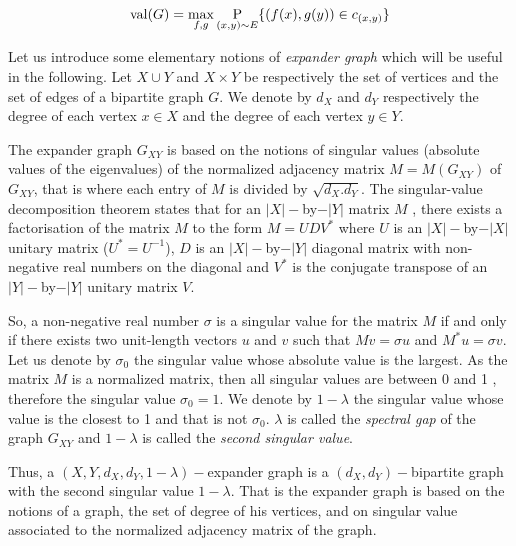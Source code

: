  $$\mathrm{val} (G)=\max_{f,g}\underset{(x,y)\sim E}{ \mathrm{P}} \{(f(x),g(y)) \in c_{(x,y)} \}$$

 Let us introduce some elementary notions of \textit{expander graph} which will be useful in the following.  Let $X \cup Y$ and $X\times Y$ be respectively the set of vertices and the set of edges of a bipartite graph $G$. We denote by $d_X$ and $d_Y$ respectively the degree of each vertex $x\in X$ and the degree of each vertex $y \in Y.$

 The expander graph $G_{XY}$ is based on the notions of  singular values (absolute values of the eigenvalues) of the normalized adjacency matrix $M=M(G_{XY})$ of $G_{XY}$, that is where each entry of $M$ is divided by $\sqrt{d_X.d_Y}.$ The singular-value decomposition theorem states that for an $|X|-$by$-|Y|$
 matrix $M$ , there exists a factorisation of the matrix $M$ to the form $M=UDV^*$ where $U$ is an $|X|-$by$-|X|$ unitary matrix ($U^*=U^{-1}$), $D$ is an $|X|-$by$-|Y|$ diagonal matrix with non-negative real numbers on the diagonal and $V^*$ is the conjugate transpose of an $|Y|-$by$-|Y|$ unitary matrix $V$.

 So, a non-negative real number $\sigma$ is a singular value for the matrix $M$ if and only if there exists two unit-length vectors $u$ and $v$ such that $Mv=\sigma u$ and $M^*u=\sigma v.$ Let us denote by $\sigma_0$ the singular value whose absolute value is the largest.  As the matrix $M$ is a normalized matrix, then all singular values are between 0 and 1 , therefore the singular value $\sigma_0=1.$
We denote by $1-\lambda$ the singular value whose value is the closest to 1 and that is not $\sigma_0$. $\lambda$ is called the \textit{spectral gap} of the graph $G_{XY}$ and $1-\lambda$ is called the \textit{second singular value}.

Thus, a $(X,Y,d_X,d_Y,1-\lambda)-$expander graph is a
$(d_X,d_Y)-$bipartite graph
with the second singular value $1-\lambda.$ That is the expander graph is based on the notions of a graph, the set of  degree of his vertices, and  on  singular value  associated to the normalized adjacency matrix  of the graph.

